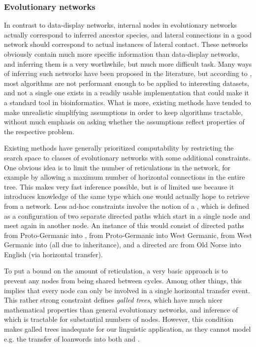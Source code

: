 \subsubsection{Evolutionary networks}
In contrast to data-display networks, internal nodes in evolutionary networks actually correspond to inferred ancestor species, and lateral connections in a good network should correspond to actual instances of lateral contact. These networks obviously contain much more specific information than data-display networks, and inferring them is a very worthwhile, but much more difficult task. Many ways of inferring such networks have been proposed in the literature, but according to \citet{morrison2011}, most algorithms are not performant enough to be applied to interesting datasets, and not a single one exists in a readily usable implementation that could make it a standard tool in bioinformatics. What is more, existing methods have tended to make unrealistic simplifying assumptions in order to keep algorithms tractable, without much emphasis on asking whether the assumptions reflect properties of the respective problem.

Existing methods have generally prioritized computability by restricting the search space to classes of evolutionary networks with some additional constraints. One obvious idea is to limit the number of reticulations in the network, for example by allowing a maximum number of horizontal connections in the entire tree. This makes very fast inference possible, but is of limited use because it introduces knowledge of the same type which one would actually hope to retrieve from a network. Less ad-hoc constraints involve the notion of a \textit{}, which is defined as a configuration of two separate directed paths which start in a single node and meet again in another node. An instance of this would consist of directed paths from Proto-Germanic into , from Proto-Germanic into West Germanic, from West Germanic into  (all due to inheritance), and a directed arc from Old Norse into English (via horizontal transfer).

To put a bound on the amount of reticulation, a very basic approach is to prevent any nodes from being shared between cycles. Among other things, this implies that every node can only be involved in a single horizontal transfer event. This rather strong constraint defines \textit{galled trees}, which have much nicer mathematical properties than general evolutionary networks, and inference of which is tractable for substantial numbers of nodes. However, this condition makes galled trees inadequate for our linguistic application, as they cannot model e.g. the transfer of  loanwords into both  and .

